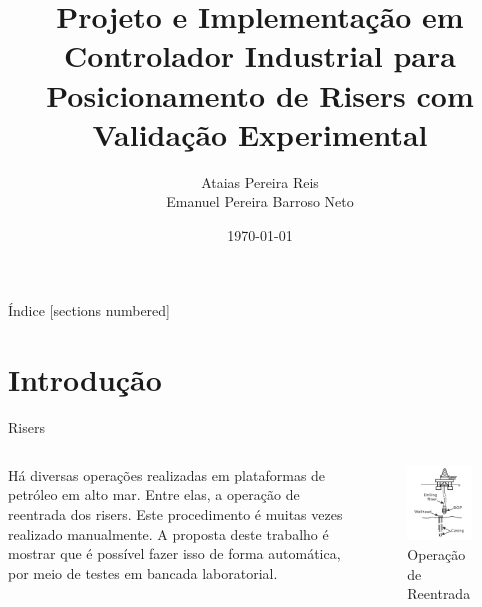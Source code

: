 \documentclass[10pt]{beamer}
\title{Projeto e Implementação em Controlador Industrial para Posicionamento de Risers com Validação Experimental}
\date{\today}
\author{Ataias Pereira Reis\\ Emanuel Pereira Barroso Neto}
\institute{Faculdade de Tecnologia\\ Universidade de Brasília}
\begin{document}
\maketitle

\begin{frame}{Índice}
  [sections numbered]
  \tableofcontents[hideallsubsections]
\end{frame}

\section{Introdução}

\begin{frame}[fragile]{Risers}

\begin{columns}[T] %
\begin{column}{.5\textwidth}

\begin{block}{} Há diversas operações realizadas em plataformas de petróleo em alto mar. Entre elas, a operação de reentrada dos risers. Este procedimento é muitas vezes realizado manualmente. A proposta deste trabalho é mostrar que é possível fazer isso de forma automática, por meio de testes em bancada laboratorial.\end{block}

\end{column}%
\hfill%
\begin{column}{.5\textwidth}

\begin{figure}[!ht]
\centering
\includegraphics[width=1\linewidth]{figures/introducao/riser}
\caption{Operação de Reentrada \cite{redytton}}
\end{figure}


\end{column}
\end{columns}
\end{frame}
\end{document}
